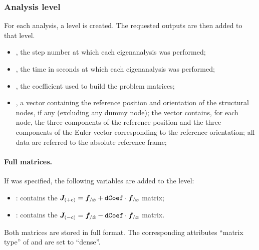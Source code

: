 \subsubsection{Analysis level}
For each analysis, a level  is created. The requested outputs 
are then added to that level.

\begin{itemize}
\item {}, the step number at which each eigenanalysis was performed;
\item {}, the time in seconds at which each eigenanalysis was performed;
\item {}, the coefficient used to build the problem matrices;
\item {}, a vector containing the reference position and orientation of the structural nodes, if any (excluding any dummy node); the vector contains, for each node, the three components of the reference position and the three components of the Euler vector corresponding to the reference orientation; all data are referred to the absolute reference frame;
\end{itemize}

\paragraph{Full matrices.}
If  was specified, the following variables are added to the
 level:
\begin{itemize}
\item {} : contains the 
    $\boldsymbol{J}_{(+c)} = \boldsymbol{f}_{/\dot{\boldsymbol{x}}} + \texttt{dCoef} \cdot \boldsymbol{f}_{/\boldsymbol{x}}$ 
    matrix;
\item {} : contains the
    $\boldsymbol{J}_{(-c)} = \boldsymbol{f}_{/\dot{\boldsymbol{x}}} - \texttt{dCoef} \cdot \boldsymbol{f}_{/\boldsymbol{x}}$ 
    matrix.
\end{itemize}
Both matrices are stored in full format. The corresponding attributes ``matrix type'' of  and  are set to ``dense''.

